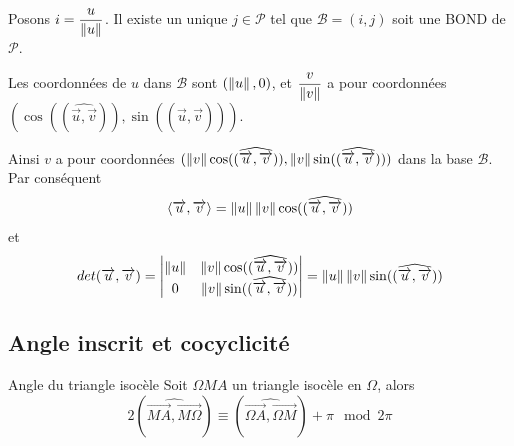 \documentclass[a4paper,12pt]{article}
\begin{document}
\begin{demonstration}
    Posons $i = \dfrac{u}{\left\lVert u\right\rVert}$. Il existe un unique $j \in \mathcal{P}$ tel que $\mathcal{B} = (i, j)$ soit une BOND de $\mathcal{P}$.

    Les coordonnées de $u$ dans $\mathcal{B}$ sont $(\left\lVert u\right\rVert, 0)$, et $\dfrac{v}{\left\lVert v\right\rVert}$ a pour coordonnées $(\cos((\widehat{\overrightarrow{u}, \overrightarrow{v}})), \sin((\widehat{\overrightarrow{u}, \overrightarrow{v}})))$.

    Ainsi $v$ a pour coordonnées $(\left\lVert v\right\rVert\cos((\widehat{\overrightarrow{u}, \overrightarrow{v}})), \left\lVert v\right\rVert\sin((\widehat{\overrightarrow{u}, \overrightarrow{v}})))$ dans la base $\mathcal{B}$.
    Par conséquent
    $$
    \langle\overrightarrow{u}, \overrightarrow{v}\rangle = \left\lVert u\right\rVert\left\lVert v\right\rVert\cos((\widehat{\overrightarrow{u}, \overrightarrow{v}}))
    $$
    et
    $$
    det(\overrightarrow{u}, \overrightarrow{v}) = \begin{vmatrix}
        \left\lVert u\right\rVert & \left\lVert v\right\rVert\cos((\widehat{\overrightarrow{u}, \overrightarrow{v}})) \\
        0 & \left\lVert v\right\rVert\sin((\widehat{\overrightarrow{u}, \overrightarrow{v}}))
    \end{vmatrix} = \left\lVert u\right\rVert\left\lVert v\right\rVert\sin((\widehat{\overrightarrow{u}, \overrightarrow{v}}))
    $$
\end{demonstration}

\subsection{Angle inscrit et cocyclicité}

\begin{lemme}{Angle du triangle isocèle}{}
    Soit $\Omega M A$ un triangle isocèle en $\Omega$, alors
    $$
    2(\widehat{\overrightarrow{MA}, \overrightarrow{M\Omega}}) \equiv (\widehat{\overrightarrow{\Omega A}, \overrightarrow{\Omega M}}) + \pi \mod 2\pi
    $$
\end{lemme}
\end{document}
